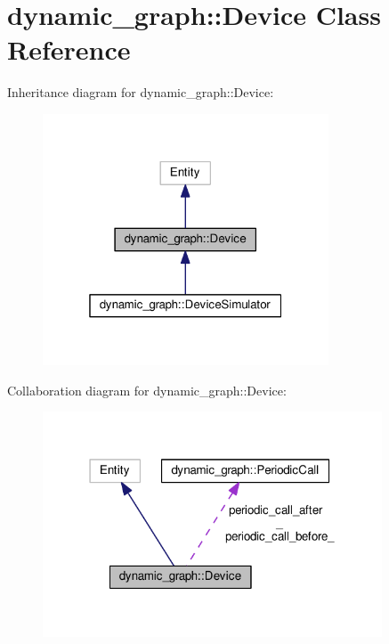 \hypertarget{classdynamic__graph_1_1Device}{}\section{dynamic\+\_\+graph\+:\+:Device Class Reference}
\label{classdynamic__graph_1_1Device}


Inheritance diagram for dynamic\+\_\+graph\+:\+:Device\+:
\nopagebreak
\begin{figure}[H]
\begin{center}
\leavevmode
\includegraphics[width=241pt]{classdynamic__graph_1_1Device__inherit__graph}
\end{center}
\end{figure}


Collaboration diagram for dynamic\+\_\+graph\+:\+:Device\+:
\nopagebreak
\begin{figure}[H]
\begin{center}
\leavevmode
\includegraphics[width=286pt]{classdynamic__graph_1_1Device__coll__graph}
\end{center}
\end{figure}
